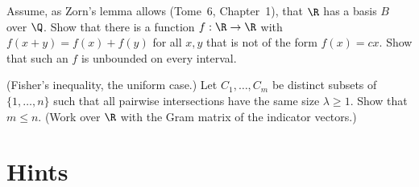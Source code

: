 \begin{exercise}[$\star\star\star$]\label{ex:hamel}
Assume, as Zorn's lemma allows (Tome~6, Chapter~1), that $\R$ has a basis $B$ over $\Q$. Show that there is a function
$f:\R\to\R$ with $f(x+y)=f(x)+f(y)$ for all $x,y$ that is not of the form $f(x)=cx$. Show that such an $f$ is unbounded
on every interval.
\end{exercise}

\begin{exercise}[$\star\star\star$]\label{ex:fisher}
(Fisher's inequality, the uniform case.) Let $C_1,\dots,C_m$ be distinct subsets of $\{1,\dots,n\}$ such that all pairwise
intersections have the same size $\lambda\ge1$. Show that $m\le n$. (Work over $\R$ with the Gram matrix of the indicator
vectors.)
\end{exercise}

\section{Hints}

